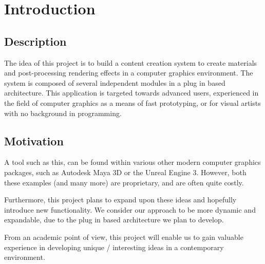 \chapter{Introduction}
 
 \section{Description}
The idea of this project is to build a content creation system to create materials and post-processing rendering effects in a computer graphics environment. The system is composed of several independent modules in a plug in based architecture. This application is targeted towards advanced users, experienced in the field of computer graphics as a means of fast prototyping, or for visual artists with no background in programming.

\section{Motivation}
A tool such as this, can be found within various other modern computer graphics packages, such as Autodesk Maya 3D or the Unreal Engine 3. However, both these examples (and many more) are proprietary, and are often quite costly. 
 
Furthermore, this project plans to expand upon these ideas and hopefully introduce new functionality. We consider our approach to be more dynamic and expandable, due to the plug in based architecture we plan to develop. 
 
From an academic point of view, this project will enable us to gain valuable experience in developing unique / interesting ideas in a contemporary environment. 
 
